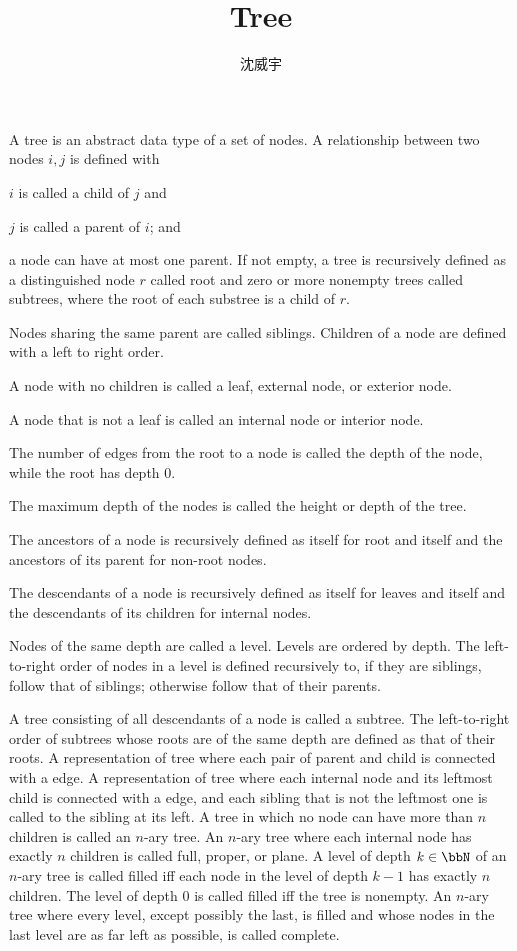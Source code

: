 \documentclass[a4paper,12pt]{article}
\begin{document}
\title{Tree} 
\author{沈威宇}
\date{\temtoday}
\titledoc
{}
A tree is an abstract data type of a set of nodes. A relationship between two nodes $i,j$ is defined with
\bit
\item $i$ is called a child of $j$ and
\item $j$ is called a parent of $i$; and
\item a node can have at most one parent.
\eit
If not empty, a tree is recursively defined as a distinguished node $r$ called root and zero or more nonempty trees called subtrees, where the root of each substree is a child of $r$.
\bit
\item Nodes sharing the same parent are called siblings. Children of a node are defined with a left to right order.
\item A node with no children is called a leaf, external node, or exterior node.
\item A node that is not a leaf is called an internal node or interior node.
\item The number of edges from the root to a node is called the depth of the node, while the root has depth $0$.
\item The maximum depth of the nodes is called the height or depth of the tree.
\item The ancestors of a node is recursively defined as itself for root and itself and the ancestors of its parent for non-root nodes.
\item The descendants of a node is recursively defined as itself for leaves and itself and the descendants of its children for internal nodes.
\item Nodes of the same depth are called a level. Levels are ordered by depth. The left-to-right order of nodes in a level is defined recursively to, if they are siblings, follow that of siblings; otherwise follow that of their parents.
\item A tree consisting of all descendants of a node is called a subtree. The left-to-right order of subtrees whose roots are of the same depth are defined as that of their roots.
\eit
{}
A representation of tree where each pair of parent and child is connected with a edge.
A representation of tree where each internal node and its leftmost child is connected with a edge, and each sibling that is not the leftmost one is called to the sibling at its left.
A tree in which no node can have more than $n$ children is called an $n$-ary tree.
An $n$-ary tree where each internal node has exactly $n$ children is called full, proper, or plane.
A level of depth $k\in\bbN$ of an $n$-ary tree is called filled iff each node in the level of depth $k-1$ has exactly $n$ children. The level of depth 0 is called filled iff the tree is nonempty.
An $n$-ary tree where every level, except possibly the last, is filled and whose nodes in the last level are as far left as possible, is called complete.
\end{document}
